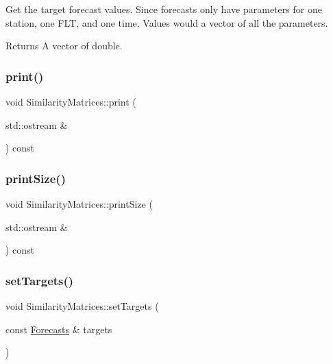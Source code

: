 Get the target forecast values. Since forecasts only have parameters for one station, one F\+LT, and one time. Values would a vector of all the parameters.

\begin{DoxyReturn}{Returns}
A vector of double. 
\end{DoxyReturn}
\mbox{\label{class_similarity_matrices_a4c179c4c5ea3bb2f187ea5e26b4b853b}} 
\subsubsection{\texorpdfstring{print()}{print()}}
{\footnotesize\ttfamily void Similarity\+Matrices\+::print (\begin{DoxyParamCaption}\item[{std\+::ostream \&}]{ }\end{DoxyParamCaption}) const}

\mbox{\label{class_similarity_matrices_a7ab85a46c3d93d519b6ea89a4856938a}} 
\subsubsection{\texorpdfstring{print\+Size()}{printSize()}}
{\footnotesize\ttfamily void Similarity\+Matrices\+::print\+Size (\begin{DoxyParamCaption}\item[{std\+::ostream \&}]{ }\end{DoxyParamCaption}) const}

\mbox{\label{class_similarity_matrices_a639c9702983460a7c0b443f3da7b18f4}} 
\subsubsection{\texorpdfstring{set\+Targets()}{setTargets()}}
{\footnotesize\ttfamily void Similarity\+Matrices\+::set\+Targets (\begin{DoxyParamCaption}\item[{const \mbox{\hyperlink{class_forecasts}{Forecasts}} \&}]{targets }\end{DoxyParamCaption})}

